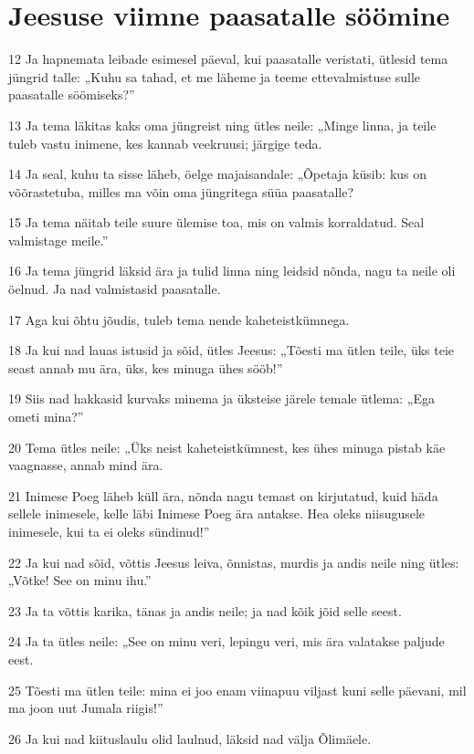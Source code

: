 \section*{Jeesuse viimne paasatalle söömine}

\par 12 Ja hapnemata leibade esimesel päeval, kui paasatalle veristati, ütlesid tema jüngrid talle: „Kuhu sa tahad, et me läheme ja teeme ettevalmistuse sulle paasatalle söömiseks?”
\par 13 Ja tema läkitas kaks oma jüngreist ning ütles neile: „Minge linna, ja teile tuleb vastu inimene, kes kannab veekruusi; järgige teda.
\par 14 Ja seal, kuhu ta sisse läheb, öelge majaisandale: „Õpetaja küsib: kus on võõrastetuba, milles ma võin oma jüngritega süüa paasatalle?
\par 15 Ja tema näitab teile suure ülemise toa, mis on valmis korraldatud. Seal valmistage meile.”
\par 16 Ja tema jüngrid läksid ära ja tulid linna ning leidsid nõnda, nagu ta neile oli öelnud. Ja nad valmistasid paasatalle.
\par 17 Aga kui õhtu jõudis, tuleb tema nende kaheteistkümnega.
\par 18 Ja kui nad lauas istusid ja sõid, ütles Jeesus: „Tõesti ma ütlen teile, üks teie seast annab mu ära, üks, kes minuga ühes sööb!”
\par 19 Siis nad hakkasid kurvaks minema ja üksteise järele temale ütlema: „Ega ometi mina?”
\par 20 Tema ütles neile: „Üks neist kaheteistkümnest, kes ühes minuga pistab käe vaagnasse, annab mind ära.
\par 21 Inimese Poeg läheb küll ära, nõnda nagu temast on kirjutatud, kuid häda sellele inimesele, kelle läbi Inimese Poeg ära antakse. Hea oleks niisugusele inimesele, kui ta ei oleks sündinud!”
\par 22 Ja kui nad sõid, võttis Jeesus leiva, õnnistas, murdis ja andis neile ning ütles: „Võtke! See on minu ihu.”
\par 23 Ja ta võttis karika, tänas ja andis neile; ja nad kõik jõid selle seest.
\par 24 Ja ta ütles neile: „See on minu veri, lepingu veri, mis ära valatakse paljude eest.
\par 25 Tõesti ma ütlen teile: mina ei joo enam viinapuu viljast kuni selle päevani, mil ma joon uut Jumala riigis!”
\par 26 Ja kui nad kiituslaulu olid laulnud, läksid nad välja Õlimäele.

